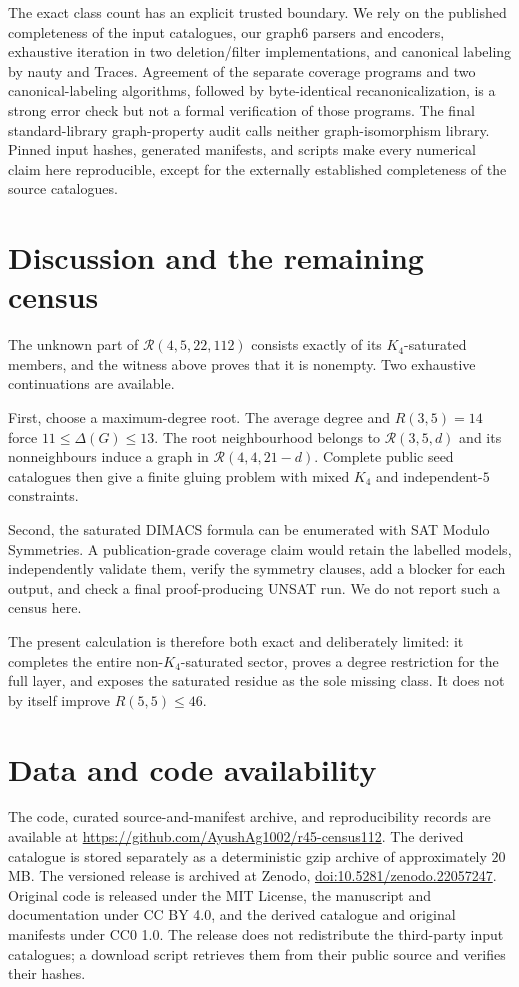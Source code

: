 \documentclass[10pt]{article}
\theoremstyle{definition}
\theoremstyle{remark}
\newcommand{\Rcal}{\mathcal{R}}
\begin{document}
The exact class count has an explicit trusted boundary.  We rely on the
published completeness of the input catalogues, our graph6 parsers and
encoders, exhaustive iteration in two deletion/filter implementations, and
canonical labeling by nauty and Traces.  Agreement of the separate coverage
programs and two canonical-labeling algorithms, followed by byte-identical
recanonicalization, is a strong error check but not a formal verification of
those programs.  The final standard-library graph-property audit calls
neither graph-isomorphism library.  Pinned input hashes, generated manifests,
and scripts make every numerical claim here reproducible, except for the
externally established completeness of the source catalogues.

\section{Discussion and the remaining census}

The unknown part of $\Rcal(4,5,22,112)$ consists exactly of its
$K_4$-saturated members, and the witness above proves that it is nonempty.
Two exhaustive continuations are available.

First, choose a maximum-degree root.  The average degree and
$R(3,5)=14$ \cite{radziszowski-survey} force
$11\leq\Delta(G)\leq13$.  The root neighbourhood belongs to
$\Rcal(3,5,d)$ and its nonneighbours induce a graph in
$\Rcal(4,4,21-d)$.  Complete public seed catalogues then give a finite gluing
problem with mixed $K_4$ and independent-$5$ constraints.

Second, the saturated DIMACS formula can be enumerated with SAT Modulo
Symmetries.  A publication-grade coverage claim would retain the labelled
models, independently validate them, verify the symmetry clauses, add a
blocker for each output, and check a final proof-producing UNSAT run.  We do
not report such a census here.

The present calculation is therefore both exact and deliberately limited:
it completes the entire non-$K_4$-saturated sector, proves a degree restriction
for the full layer, and exposes the saturated residue as the sole missing
class.  It does not by itself improve $R(5,5)\leq46$.

\section*{Data and code availability}

The code, curated source-and-manifest archive, and reproducibility records are
available at \url{https://github.com/AyushAg1002/r45-census112}.  The
derived catalogue is stored separately as a deterministic gzip archive of
approximately $20$ MB.  The versioned release is archived at Zenodo,
\href{https://doi.org/10.5281/zenodo.22057247}{doi:10.5281/zenodo.22057247}.
Original code is released under the MIT
License, the manuscript and documentation under CC BY 4.0, and the derived
catalogue and original manifests under CC0 1.0.  The release does not
redistribute the third-party input catalogues; a download script retrieves
them from their public source and verifies their hashes.
\end{document}
